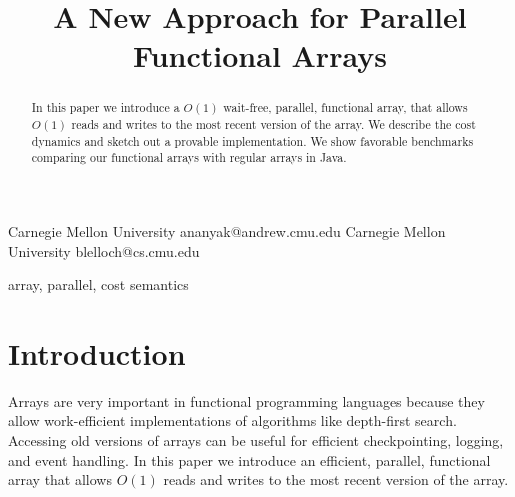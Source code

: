 \documentclass[preprint]{sigplanconf}
\begin{document}
\setlength{\pdfpageheight}{\paperheight}
\setlength{\pdfpagewidth}{\paperwidth}




\title{A New Approach for Parallel Functional Arrays}

           {Carnegie Mellon University}
           {ananyak@andrew.cmu.edu}
           {Carnegie Mellon University}
           {blelloch@cs.cmu.edu}

\maketitle

\newtheorem{theorem}{Theorem}[section]
\newtheorem{corollary}{Corollary}[theorem]
\newtheorem{lemma}[theorem]{Lemma}

\begin{abstract}
In this paper we introduce a $O(1)$ wait-free, parallel, functional array, that allows $O(1)$ reads and writes to the most recent version of the array. We describe the cost dynamics and sketch out a provable implementation. We show favorable benchmarks comparing our functional arrays with regular arrays in Java.
\end{abstract}


\keywords
array, parallel, cost semantics

\section{Introduction}

Arrays are very important in functional programming languages because they allow work-efficient implementations of algorithms like depth-first search. Accessing old versions of arrays can be useful for efficient checkpointing, logging, and event handling. In this paper we introduce an efficient, parallel, functional array that allows $O(1)$ reads and writes to the most recent version of the array.
\end{document}
